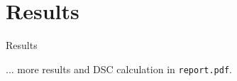 \section[Results]{Results}

\begin{frame}{Results}
    \begin{figure}[h!]
        \centering
        \resizebox{0.4\textwidth}{!}{}
    \end{figure}
    ... more results and DSC calculation in \texttt{report.pdf}.
\end{frame}
